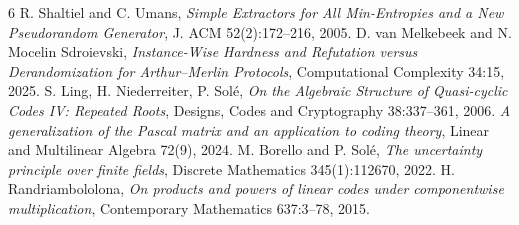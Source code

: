 \documentclass[11pt]{article}
\begin{document}
\begin{thebibliography}{6}
 R. Shaltiel and C. Umans, \emph{Simple Extractors for All Min-Entropies and a New Pseudorandom Generator}, J. ACM 52(2):172--216, 2005.
 D. van Melkebeek and N. Mocelin Sdroievski, \emph{Instance-Wise Hardness and Refutation versus Derandomization for Arthur--Merlin Protocols}, Computational Complexity 34:15, 2025.
 S. Ling, H. Niederreiter, P. Sol\'e, \emph{On the Algebraic Structure of Quasi-cyclic Codes IV: Repeated Roots}, Designs, Codes and Cryptography 38:337--361, 2006.
 \emph{A generalization of the Pascal matrix and an application to coding theory}, Linear and Multilinear Algebra 72(9), 2024.
 M. Borello and P. Sol\'e, \emph{The uncertainty principle over finite fields}, Discrete Mathematics 345(1):112670, 2022.
 H. Randriambololona, \emph{On products and powers of linear codes under componentwise multiplication}, Contemporary Mathematics 637:3--78, 2015.
\end{thebibliography}
\end{document}

